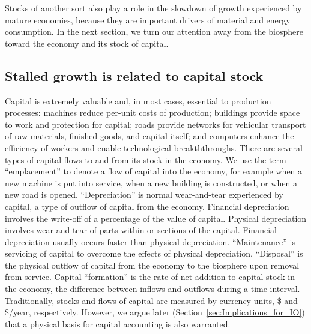 Stocks of another sort also play a role 
in the slowdown of growth experienced by mature economies,
because they  are important drivers of material and energy consumption.
In the next section, we turn our attention 
away from the biosphere 
toward the economy and its stock of capital.


\subsection{Stalled growth is related to capital stock}
\label{sec:stall_capital_stock}

Capital is extremely valuable and, in most cases, essential to production processes:
machines reduce per-unit costs of production;
buildings provide space to work and protection for capital;
roads provide networks for vehicular transport 
of raw materials, finished goods, and capital itself; and
computers enhance the efficiency of workers and enable technological breakththroughs.
There are several types of capital flows
to and from its stock in the economy.
We use the term ``emplacement'' to denote a flow of capital into
the economy, for example when a new machine is put into service,
when a new building is constructed, or
when a new road is opened.
``Depreciation'' is normal wear-and-tear experienced by capital, 
a type of outflow of capital from the economy.
Financial depreciation involves the write-off of a percentage 
of the value of capital.
Physical depreciation involves wear and tear of parts within or sections of the capital.
Financial depreciation usually occurs faster than physical depreciation.
``Maintenance'' is servicing of capital to overcome the effects of physical depreciation.
``Disposal'' is the physical outflow of capital from the economy to the biosphere
upon removal from service.
Capital ``formation'' is the rate of net
addition to capital stock in the economy,
the difference between inflows and outflows
during a time interval.
Traditionally, stocks and flows of capital are measured by currency units, 
\$ and \$/year, respectively.
However, we argue later (Section~\ref{sec:Implications_for_IO})
that a physical basis for capital accounting is also warranted.

